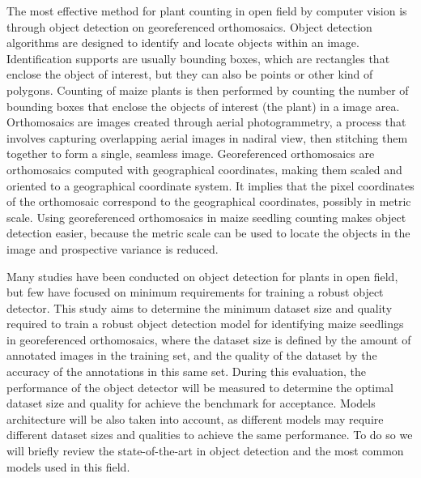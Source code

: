 \documentclass[journal,article,submit,pdftex,moreauthors]{Definitions/mdpi}
\begin{document}
The most effective method for plant counting in open field by computer vision 
is through object detection on georeferenced orthomosaics.
Object detection algorithms are designed to identify and locate objects within an image.
Identification supports are usually bounding boxes, which are rectangles that enclose
the object of interest, but they can also be points or other kind of polygons.
Counting of maize plants is then performed by counting the number of bounding boxes 
that enclose the objects of interest (the plant) in a image area.
Orthomosaics are images created through aerial photogrammetry, a process 
that involves capturing overlapping aerial images in nadiral view, 
then stitching them together to form a single, seamless image.
Georeferenced orthomosaics are orthomosaics computed with geographical coordinates,
making them scaled and oriented to a geographical coordinate system.
It implies that the pixel coordinates of the orthomosaic correspond to the 
geographical coordinates, possibly in metric scale.
Using georeferenced orthomosaics in maize seedling counting makes object detection 
easier, because the metric scale can be used to locate the objects 
in the image and prospective variance is reduced.

Many studies have been conducted on object detection for plants in open field,
but few have focused on minimum requirements for training a robust object detector.
This study aims to determine the minimum dataset size and quality required to train 
a robust object detection model for identifying maize seedlings in georeferenced orthomosaics,
where the dataset size is defined by the amount of annotated images in the training set,
and the quality of the dataset by the accuracy of the annotations in this same set.
During this evaluation, the performance of the object detector will be measured
to determine the optimal dataset size and quality for achieve the benchmark for acceptance.
Models architecture will be also taken into account, as different models may require
different dataset sizes and qualities to achieve the same performance.
To do so we will briefly review the state-of-the-art in object detection 
and the most common models used in this field.
\end{document}
